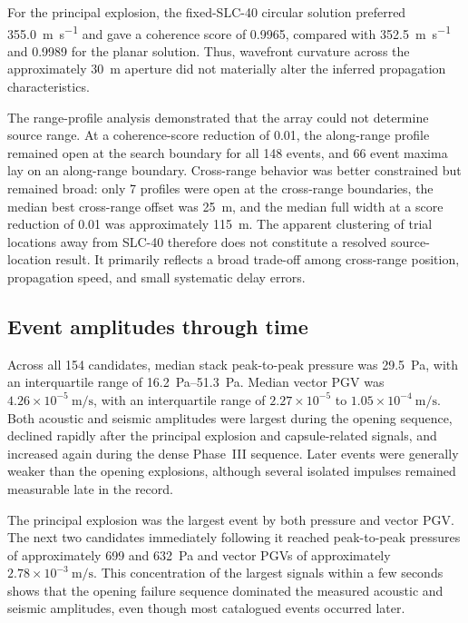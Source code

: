 \documentclass[]{seismica}
\begin{document}
For the principal explosion, the fixed-SLC-40 circular solution preferred
\SI{355.0}{\metre\per\second} and gave a coherence score of 0.9965, compared
with \SI{352.5}{\metre\per\second} and 0.9989 for the planar solution. Thus,
wavefront curvature across the approximately \SI{30}{\metre} aperture did not
materially alter the inferred propagation characteristics.

The range-profile analysis demonstrated that the array could not determine
source range. At a coherence-score reduction of 0.01, the along-range profile
remained open at the search boundary for all 148 events, and 66 event maxima lay
on an along-range boundary. Cross-range behavior was better constrained but
remained broad: only 7 profiles were open at the cross-range boundaries, the
median best cross-range offset was \SI{25}{\metre}, and the median full width at
a score reduction of 0.01 was approximately \SI{115}{\metre}. The apparent
clustering of trial locations away from SLC-40 therefore does not constitute a
resolved source-location result. It primarily reflects a broad trade-off among
cross-range position, propagation speed, and small systematic delay errors.


\subsection{Event amplitudes through time}
\label{sec:results_temporal}

Across all 154 candidates, median stack peak-to-peak pressure was
\SI{29.5}{\pascal}, with an interquartile range of
\SIrange{16.2}{51.3}{\pascal}. Median vector PGV was
$4.26\times10^{-5}\ \si{\metre\per\second}$, with an interquartile range of
$2.27\times10^{-5}$ to
$1.05\times10^{-4}\ \si{\metre\per\second}$. Both acoustic and seismic
amplitudes were largest during the opening sequence, declined rapidly after the
principal explosion and capsule-related signals, and increased again during the
dense Phase~III sequence. Later events were generally weaker than the
opening explosions, although several isolated impulses remained measurable late
in the record.

The principal explosion was the largest event by both pressure and vector PGV.
The next two candidates immediately following it reached peak-to-peak pressures
of approximately 699 and \SI{632}{\pascal} and vector PGVs of approximately
$2.78\times10^{-3}\ \si{\metre\per\second}$. This concentration of the largest
signals within a few seconds shows that the opening failure sequence dominated
the measured acoustic and seismic amplitudes, even though most catalogued events
occurred later.
\end{document}
